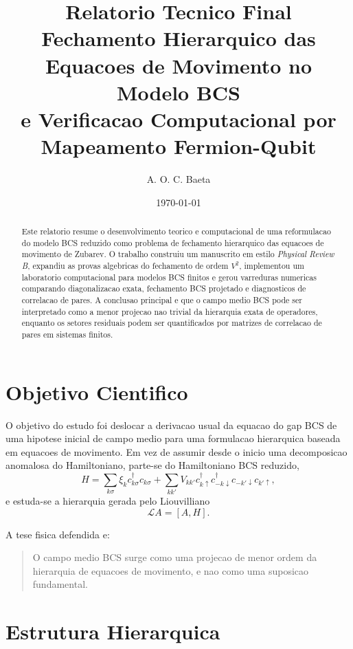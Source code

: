 \documentclass[11pt,a4paper]{article}
\title{Relatorio Tecnico Final\\
Fechamento Hierarquico das Equacoes de Movimento no Modelo BCS\\
e Verificacao Computacional por Mapeamento Fermion-Qubit}
\author{A. O. C. Baeta}
\date{\today}
\begin{document}
\maketitle

\begin{abstract}
Este relatorio resume o desenvolvimento teorico e computacional de uma reformulacao do modelo BCS reduzido como problema de fechamento hierarquico das equacoes de movimento de Zubarev. O trabalho construiu um manuscrito em estilo \textit{Physical Review B}, expandiu as provas algebricas do fechamento de ordem \(V^2\), implementou um laboratorio computacional para modelos BCS finitos e gerou varreduras numericas comparando diagonalizacao exata, fechamento BCS projetado e diagnosticos de correlacao de pares. A conclusao principal e que o campo medio BCS pode ser interpretado como a menor projecao nao trivial da hierarquia exata de operadores, enquanto os setores residuais podem ser quantificados por matrizes de correlacao de pares em sistemas finitos.
\end{abstract}

\section{Objetivo Cientifico}

O objetivo do estudo foi deslocar a derivacao usual da equacao do gap BCS de uma hipotese inicial de campo medio para uma formulacao hierarquica baseada em equacoes de movimento. Em vez de assumir desde o inicio uma decomposicao anomalosa do Hamiltoniano, parte-se do Hamiltoniano BCS reduzido,
\begin{equation}
H=\sum_{k\sigma}\xi_k c^\dagger_{k\sigma}c_{k\sigma}
+\sum_{kk'}V_{kk'}
c^\dagger_{k\uparrow}c^\dagger_{-k\downarrow}
c_{-k'\downarrow}c_{k'\uparrow},
\end{equation}
e estuda-se a hierarquia gerada pelo Liouvilliano
\begin{equation}
\mathcal{L}A=[A,H].
\end{equation}

A tese fisica defendida e:
\begin{quote}
O campo medio BCS surge como uma projecao de menor ordem da hierarquia de equacoes de movimento, e nao como uma suposicao fundamental.
\end{quote}

\section{Estrutura Hierarquica}
\end{document}
